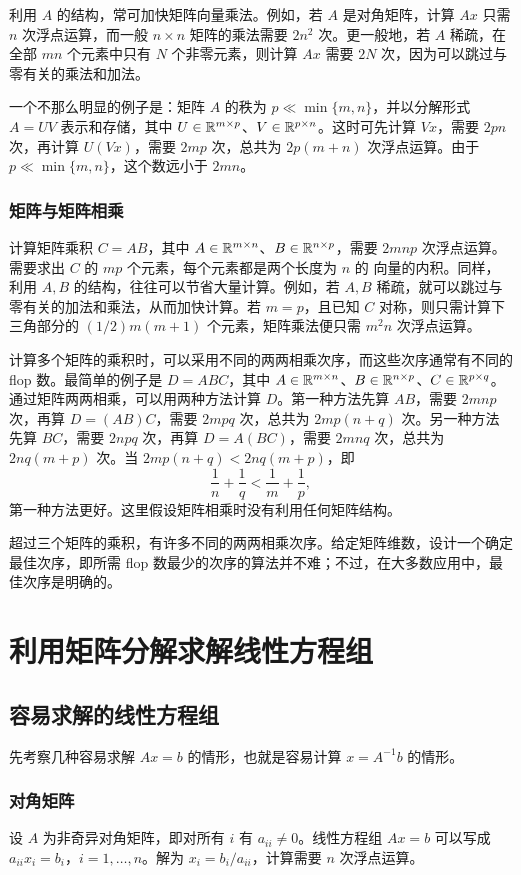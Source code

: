 利用 $A$ 的结构，常可加快矩阵向量乘法。例如，若 $A$ 是对角矩阵，计算 $Ax$ 只需 $n$ 次浮点运算，而一般 $n\times n$ 矩阵的乘法需要 $2n^2$ 次。更一般地，若 $A$ 稀疏，在全部 $mn$ 个元素中只有 $N$ 个非零元素，则计算 $Ax$ 需要 $2N$ 次，因为可以跳过与零有关的乘法和加法。

一个不那么明显的例子是：矩阵 $A$ 的秩为 $p\ll\min\{m,n\}$，并以分解形式 $A=UV$ 表示和存储，其中 $U\in\mathbb R^{m\times p}$、$V\in\mathbb R^{p\times n}$。这时可先计算 $Vx$，需要 $2pn$ 次，再计算 $U(Vx)$，需要 $2mp$ 次，总共为 $2p(m+n)$ 次浮点运算。由于 $p\ll\min\{m,n\}$，这个数远小于 $2mn$。

\subsubsection*{矩阵与矩阵相乘}
计算矩阵乘积 $C=AB$，其中 $A\in\mathbb R^{m\times n}$、$B\in\mathbb R^{n\times p}$，需要 $2mnp$ 次浮点运算。需要求出 $C$ 的 $mp$ 个元素，每个元素都是两个长度为 $n$ 的
向量的内积。同样，利用 $A,B$ 的结构，往往可以节省大量计算。例如，若 $A,B$ 稀疏，就可以跳过与零有关的加法和乘法，从而加快计算。若 $m=p$，且已知 $C$ 对称，则只需计算下三角部分的 $(1/2)m(m+1)$ 个元素，矩阵乘法便只需 $m^2n$ 次浮点运算。

计算多个矩阵的乘积时，可以采用不同的两两相乘次序，而这些次序通常有不同的 flop 数。最简单的例子是 $D=ABC$，其中 $A\in\mathbb R^{m\times n}$、$B\in\mathbb R^{n\times p}$、$C\in\mathbb R^{p\times q}$。通过矩阵两两相乘，可以用两种方法计算 $D$。第一种方法先算 $AB$，需要 $2mnp$ 次，再算 $D=(AB)C$，需要 $2mpq$ 次，总共为 $2mp(n+q)$ 次。另一种方法先算 $BC$，需要 $2npq$ 次，再算 $D=A(BC)$，需要 $2mnq$ 次，总共为 $2nq(m+p)$ 次。当 $2mp(n+q)<2nq(m+p)$，即
\[
 \frac1n+\frac1q<\frac1m+\frac1p,
\]
第一种方法更好。这里假设矩阵相乘时没有利用任何矩阵结构。

超过三个矩阵的乘积，有许多不同的两两相乘次序。给定矩阵维数，设计一个确定最佳次序，即所需 flop 数最少的次序的算法并不难；不过，在大多数应用中，最佳次序是明确的。

\section{利用矩阵分解求解线性方程组}
\subsection{容易求解的线性方程组}
先考察几种容易求解 $Ax=b$ 的情形，也就是容易计算 $x=A^{-1}b$ 的情形。

\subsubsection*{对角矩阵}
设 $A$ 为非奇异对角矩阵，即对所有 $i$ 有 $a_{ii}\neq0$。线性方程组 $Ax=b$ 可以写成 $a_{ii}x_i=b_i$，$i=1,\ldots,n$。解为 $x_i=b_i/a_{ii}$，计算需要 $n$ 次浮点运算。

